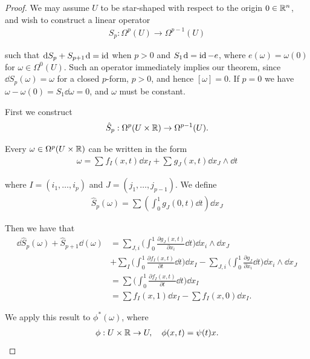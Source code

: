\begin{proof}
  We may assume $U$ to be star-shaped with respect to the origin $0\in{\ensuremath{\mathbb{R}}}^n$,
and wish to construct a linear operator
\begin{align*}
  S_p: \Omega^p(U) \to \Omega^{p-1}(U)
\end{align*}

such that $\dd S_p + S_{p+1}\dd = \id$ when $p > 0$ and $S_1\dd = \id - e$, where $e(\omega) = \omega(0)$
for $\omega\in\Omega^0(U)$. Such an operator immediately implies our theorem, since
$\dd S_p(\omega) = \omega$ for a closed $p$-form, $p > 0$, and hence $[\omega] = 0$. If $p = 0$ we
have $\omega - \omega(0) = S_1\dd\omega = 0$, and $\omega$ must be constant.

First we construct
\begin{align*}
  \hat{S}_p:\Omega^p(U\times{\ensuremath{\mathbb{R}}})\to\Omega^{p-1}(U).
\end{align*}

Every $\omega\in\Omega^p(U\times{\ensuremath{\mathbb{R}}})$ can be written in the form
\begin{align*}
  \omega = \sum_{}^{}{f_I(x, t)\dd x_I} + \sum_{}^{}{g_J(x, t)\dd x_J\wedge\dd t}
\end{align*}

where $I= (i_1, \ldots, i_p)$ and $J = (j_1, \ldots, j_{p-1})$. We define
\begin{align*}
  \hat{S}_p(\omega) = \sum\left(\int_{0}^{1}g_J(0, t)\dd t\right)\dd x_J
\end{align*}

Then we have that 
\begin{align*}
    \dd\hat{S}_{p}(\omega)+\hat{S}_{p+1}\dd(\omega)
    & = \sum_{J,i}\biggl(\int_{0}^{1}\frac{\partial g_{J}(x,t)}{\partial x_{i}}\dd t\biggr)\dd x_{i}\wedge\dd x_{J} \\
    & + \sum_{I}\biggl(\int_{0}^{1}\frac{\partial f_{I}(x,t)}{\partial t}\dd t\biggr)\dd x_{I}
        - \sum_{J,i}\biggl(\int_{0}^{1}\frac{\partial g_{J}}{\partial x_{i}}\dd t\biggr)\dd x_{i}\wedge\dd x_{J} \\
    & = \sum\biggl(\int_{0}^{1}\frac{\partial f_{I}(x,t)}{\partial t}\dd t\biggr)\dd x_{I} \\
    & = \sum f_{I}(x,1)\dd x_{I}-\sum f_{I}(x,0)\dd x_{I}.
\end{align*}

We apply this result to $\phi^*(\omega)$, where 
\begin{align*}
  \phi:U \times {\ensuremath{\mathbb{R}}}\to U, \quad \phi(x, t) = \psi(t)x.
\end{align*}


\end{proof}
